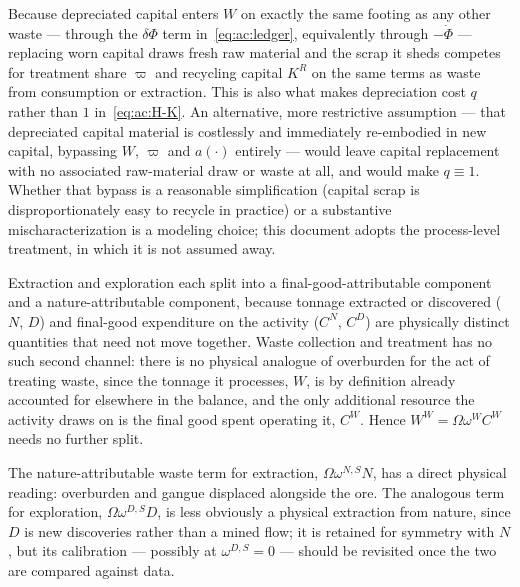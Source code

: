 \begin{remark}\label{rem:ac:depreciation}
Because depreciated capital enters $W$ on exactly the same footing as any other waste --- through the $\delta\Phi$ term in~\eqref{eq:ac:ledger}, equivalently through $-\dot\Phi$ --- replacing worn capital draws fresh raw material and the scrap it sheds competes for treatment share $\varpi$ and recycling capital $K^R$ on the same terms as waste from consumption or extraction. This is also what makes depreciation cost $q$ rather than $1$ in~\eqref{eq:ac:H-K}. An alternative, more restrictive assumption --- that depreciated capital material is costlessly and immediately re-embodied in new capital, bypassing $W$, $\varpi$ and $a(\cdot)$ entirely --- would leave capital replacement with no associated raw-material draw or waste at all, and would make $q\equiv1$. Whether that bypass is a reasonable simplification (capital scrap is disproportionately easy to recycle in practice) or a substantive mischaracterization is a modeling choice; this document adopts the process-level treatment, in which it is not assumed away.
\end{remark}

\begin{remark}\label{rem:ac:units}
Extraction and exploration each split into a final-good-attributable component and a nature-attributable component, because tonnage extracted or discovered ($N$, $D$) and final-good expenditure on the activity ($C^N$, $C^D$) are physically distinct quantities that need not move together. Waste collection and treatment has no such second channel: there is no physical analogue of overburden for the act of treating waste, since the tonnage it processes, $W$, is by definition already accounted for elsewhere in the balance, and the only additional resource the activity draws on is the final good spent operating it, $C^W$. Hence $W^W=\Omega\omega^WC^W$ needs no further split.
\end{remark}

\begin{remark}\label{rem:ac:dexploration}
The nature-attributable waste term for extraction, $\Omega\omega^{N,S}N$, has a direct physical reading: overburden and gangue displaced alongside the ore. The analogous term for exploration, $\Omega\omega^{D,S}D$, is less obviously a physical extraction from nature, since $D$ is new discoveries rather than a mined flow; it is retained for symmetry with $N$, but its calibration --- possibly at $\omega^{D,S}=0$ --- should be revisited once the two are compared against data.
\end{remark}

